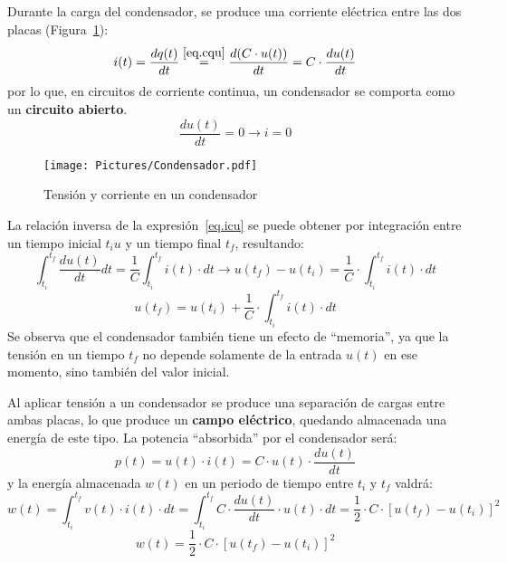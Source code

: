 \documentclass[11pt]{book} %
\numberwithin{dummy}{section}
\theoremstyle{ocrenumbox}
\theoremstyle{blacknumex}
\theoremstyle{blacknumbox}
\theoremstyle{ocrenum}
\begin{document}
	Durante la carga del condensador, se produce una corriente eléctrica entre las dos placas (Figura~\ref{fig.condensador}): 
	\begin{equation*}\label{eq.icu}
		i(t)=\dfrac{dq(t)}{dt}\stackrel{\eqref{eq.cqu}}{=}\dfrac{d(C\cdot u(t))}{dt}=C\cdot \dfrac{du(t)}{dt}
	\end{equation*}
	por lo que, en circuitos de corriente continua, un condensador se comporta como un \textbf{circuito abierto}.
	\begin{equation*}
		\frac{du(t)}{dt} = 0 \rightarrow i = 0
	\end{equation*}
	\begin{figure}[htbp]
		\centering
		\texttt{[image: Pictures/Condensador.pdf]}
		\caption{Tensión y corriente en un condensador}
		\label{fig.condensador}
	\end{figure}
	
	La relación inversa de la expresión~\eqref{eq.icu} se puede obtener por integración entre un tiempo inicial $t_iu$ y un tiempo final $t_f$, resultando:
	\begin{equation*}
		\int_{t_i}^{t_f} \dfrac{du(t)}{dt}dt=\dfrac{1}{C}\int_{t_i}^{t_f}i(t)\cdot dt \rightarrow u(t_f)-u(t_i)=\dfrac{1}{C}\cdot\int_{t_i}^{t_f} i(t)\cdot dt
	\end{equation*}
	\begin{equation}\label{eq.u_C}
		\boxed{u(t_f)=u(t_i)+\dfrac{1}{C}\cdot\int_{t_i}^{t_f} i(t)\cdot dt}
	\end{equation}
	Se observa que el condensador también tiene un efecto de ``memoria'', ya que la tensión en un tiempo $t_f$ no depende solamente de la entrada $u(t)$ en ese momento, sino también del valor inicial.
	
	Al aplicar tensión a un condensador se produce una separación de cargas entre ambas placas, lo que produce un \textbf{campo eléctrico}, quedando almacenada una energía de este tipo. La potencia ``absorbida'' por el condensador será:
	\begin{equation*}
		p(t)=u(t)\cdot i(t)=C\cdot u(t)\cdot\dfrac{du(t)}{dt}
	\end{equation*}
	y la energía almacenada $w(t)$ en un periodo de tiempo entre $t_i$ y $t_f$ valdrá:
	\begin{equation*}
		w(t)=\int_{t_i}^{t_f}v(t)\cdot i(t)\cdot dt=\int_{t_i}^{t_f}C\cdot\dfrac{du(t)}{dt}\cdot u(t)\cdot dt=\dfrac{1}{2}\cdot C\cdot [u(t_f)-u(t_i)]^2
	\end{equation*}
	\begin{equation}
		\boxed{w(t)=\dfrac{1}{2}\cdot C\cdot [u(t_f)-u(t_i)]^2}
	\end{equation}
	
\end{document}
